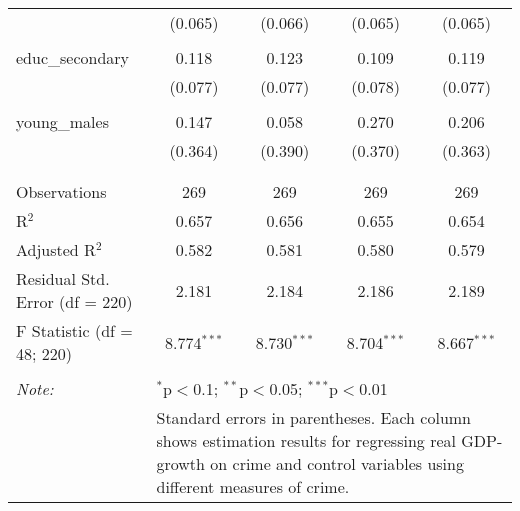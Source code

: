 \begin{table}[!htbp]
\begin{tabular}{@{\extracolsep{5pt}}lcccc}
  & (0.065) & (0.066) & (0.065) & (0.065) \\ 
  & & & & \\ 
 educ\_secondary & 0.118 & 0.123 & 0.109 & 0.119 \\ 
  & (0.077) & (0.077) & (0.078) & (0.077) \\ 
  & & & & \\ 
 young\_males & 0.147 & 0.058 & 0.270 & 0.206 \\ 
  & (0.364) & (0.390) & (0.370) & (0.363) \\ 
  & & & & \\ 
\hline \\[-1.8ex] 
Observations & 269 & 269 & 269 & 269 \\ 
R$^{2}$ & 0.657 & 0.656 & 0.655 & 0.654 \\ 
Adjusted R$^{2}$ & 0.582 & 0.581 & 0.580 & 0.579 \\ 
Residual Std. Error (df = 220) & 2.181 & 2.184 & 2.186 & 2.189 \\ 
F Statistic (df = 48; 220) & 8.774$^{***}$ & 8.730$^{***}$ & 8.704$^{***}$ & 8.667$^{***}$ \\ 
\hline 
\hline \\[-1.8ex] 
\textit{Note:}  & \multicolumn{4}{l}{$^{*}$p$<$0.1; $^{**}$p$<$0.05; $^{***}$p$<$0.01} \\ 
 & \multicolumn{4}{l}{Standard errors in parentheses. Each column shows estimation results for regressing real GDP-growth on crime and control variables using different measures of crime.} \\ 
\end{tabular} 
\end{table} 

